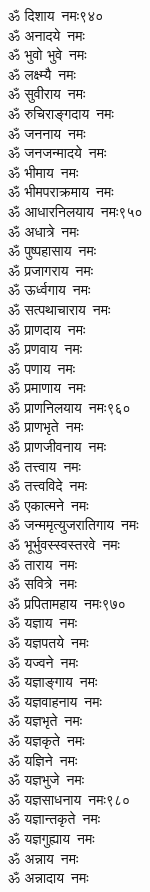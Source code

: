 \begin{multicols}{2}
\begin{flushleft}
ॐ दिशाय~नमः\hfill ९४०\\
ॐ अनादये~नमः\\
ॐ भुवो भुवे~नमः\\
ॐ लक्ष्म्यै~नमः\\
ॐ सुवीराय~नमः\\
ॐ रुचिराङ्गदाय~नमः\\
ॐ जननाय~नमः\\
ॐ जनजन्मादये~नमः\\
ॐ भीमाय~नमः\\
ॐ भीमपराक्रमाय~नमः\\
ॐ आधारनिलयाय~नमः\hfill ९५०\\
ॐ अधात्रे~नमः\\
ॐ पुष्पहासाय~नमः\\
ॐ प्रजागराय~नमः\\
ॐ ऊर्ध्वगाय~नमः\\
ॐ सत्पथाचाराय~नमः\\
ॐ प्राणदाय~नमः\\
ॐ प्रणवाय~नमः\\
ॐ पणाय~नमः\\
ॐ प्रमाणाय~नमः\\
ॐ प्राणनिलयाय~नमः\hfill ९६०\\
ॐ प्राणभृते~नमः\\
ॐ प्राणजीवनाय~नमः\\
ॐ तत्त्वाय~नमः\\
ॐ तत्त्वविदे~नमः\\
ॐ एकात्मने~नमः\\
ॐ जन्ममृत्युजरातिगाय~नमः\\
ॐ भूर्भुवस्स्वस्तरवे~नमः\\
ॐ ताराय~नमः\\
ॐ सवित्रे~नमः\\
ॐ प्रपितामहाय~नमः\hfill ९७०\\
ॐ यज्ञाय~नमः\\
ॐ यज्ञपतये~नमः\\
ॐ यज्वने~नमः\\
ॐ यज्ञाङ्गाय~नमः\\
ॐ यज्ञवाहनाय~नमः\\
ॐ यज्ञभृते~नमः\\
ॐ यज्ञकृते~नमः\\
ॐ यज्ञिने~नमः\\
ॐ यज्ञभुजे~नमः\\
ॐ यज्ञसाधनाय~नमः\hfill ९८०\\
ॐ यज्ञान्तकृते~नमः\\
ॐ यज्ञगुह्याय~नमः\\
ॐ अन्नाय~नमः\\
ॐ अन्नादाय~नमः\\

\end{flushleft}
\end{multicols}
